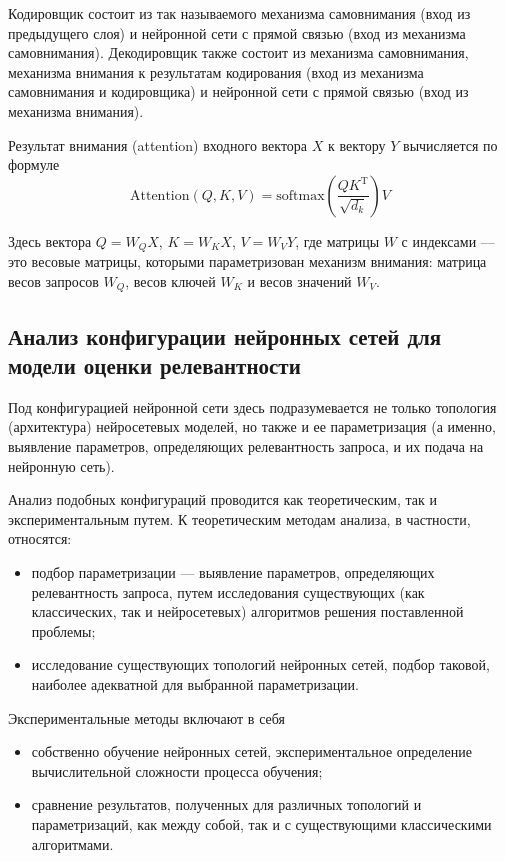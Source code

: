 Кодировщик состоит из так называемого механизма самовнимания (вход из предыдущего слоя) и нейронной сети
с прямой связью (вход из механизма самовнимания). Декодировщик также состоит из механизма самовнимания, механизма внимания 
к результатам кодирования (вход из механизма самовнимания и кодировщика) и нейронной сети с прямой связью (вход из механизма внимания). 

Результат внимания (attention) входного вектора $X$ к вектору $Y$ вычисляется по формуле
\begin{equation}
    \text{Attention}(Q, K, V) = \text{softmax}\left(\frac{QK^\mathrm{T}}{\sqrt{d_k}}\right)V
\end{equation} 

Здесь вектора $Q=W_Q X$, $K = W_K X$, $V = W_V Y$, где матрицы $W$ с индексами --- это весовые матрицы, которыми параметризован
механизм внимания: матрица весов запросов $W_Q$, весов ключей $W_K$ и весов значений $W_V$.

\subsection{Анализ конфигурации нейронных сетей для модели оценки релевантности}
Под конфигурацией нейронной сети здесь подразумевается не только топология (архитектура) нейросетевых моделей, но также и 
ее параметризация (а именно, выявление параметров, определяющих релевантность запроса, и их подача на нейронную сеть).

Анализ подобных конфигураций проводится как теоретическим, так и экспериментальным путем. К теоретическим методам анализа,
в частности, относятся:
\begin{itemize}
    \item подбор параметризации --- выявление параметров, определяющих релевантность запроса, путем исследования существующих 
          (как классических, так и нейросетевых) алгоритмов решения поставленной проблемы;
    \item исследование существующих топологий нейронных сетей, подбор таковой, наиболее адекватной для выбранной параметризации.
\end{itemize}
Экспериментальные методы включают в себя 
\begin{itemize}
    \item собственно обучение нейронных сетей, экспериментальное определение вычислительной сложности процесса обучения;
    \item сравнение результатов, полученных для различных топологий и параметризаций, как между собой, так и с существующими классическими алгоритмами.
\end{itemize}

